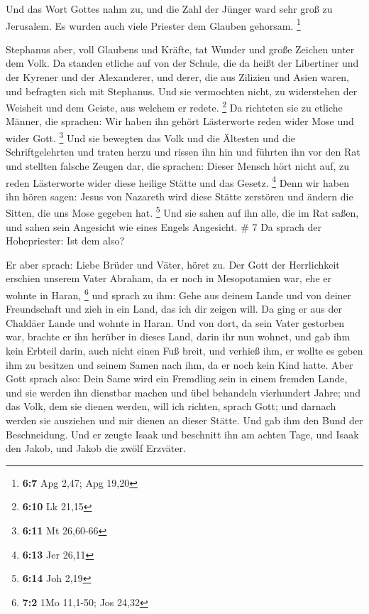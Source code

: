  Und das Wort Gottes nahm zu, und die Zahl der Jünger ward
sehr groß zu Jerusalem. Es wurden auch viele Priester dem Glauben
gehorsam. \footnote{\textbf{6:7} Apg 2,47; Apg 19,20}

 Stephanus aber, voll Glaubens und Kräfte, tat Wunder und
große Zeichen unter dem Volk.  Da standen etliche auf von
der Schule, die da heißt der Libertiner und der Kyrener und der
Alexanderer, und derer, die aus Zilizien und Asien waren, und befragten
sich mit Stephanus.  Und sie vermochten nicht, zu
widerstehen der Weisheit und dem Geiste, aus welchem er redete.
\footnote{\textbf{6:10} Lk 21,15}  Da richteten sie zu
etliche Männer, die sprachen: Wir haben ihn gehört Lästerworte reden
wider Mose und wider Gott. \footnote{\textbf{6:11} Mt 26,60-66}
 Und sie bewegten das Volk und die Ältesten und die
Schriftgelehrten und traten herzu und rissen ihn hin und führten ihn vor
den Rat  und stellten falsche Zeugen dar, die sprachen:
Dieser Mensch hört nicht auf, zu reden Lästerworte wider diese heilige
Stätte und das Gesetz. \footnote{\textbf{6:13} Jer 26,11} 
Denn wir haben ihn hören sagen: Jesus von Nazareth wird diese Stätte
zerstören und ändern die Sitten, die uns Mose gegeben hat. \footnote{\textbf{6:14}
  Joh 2,19}  Und sie sahen auf ihn alle, die im Rat saßen,
und sahen sein Angesicht wie eines Engels Angesicht. \# 7 
Da sprach der Hohepriester: Ist dem also?

 Er aber sprach: Liebe Brüder und Väter, höret zu. Der Gott
der Herrlichkeit erschien unserem Vater Abraham, da er noch in
Mesopotamien war, ehe er wohnte in Haran, \footnote{\textbf{7:2} 1Mo
  11,1-50; Jos 24,32}  und sprach zu ihm: Gehe aus deinem
Lande und von deiner Freundschaft und zieh in ein Land, das ich dir
zeigen will.  Da ging er aus der Chaldäer Lande und wohnte
in Haran. Und von dort, da sein Vater gestorben war, brachte er ihn
herüber in dieses Land, darin ihr nun wohnet,  und gab ihm
kein Erbteil darin, auch nicht einen Fuß breit, und verhieß ihm, er
wollte es geben ihm zu besitzen und seinem Samen nach ihm, da er noch
kein Kind hatte.  Aber Gott sprach also: Dein Same wird ein
Fremdling sein in einem fremden Lande, und sie werden ihn dienstbar
machen und übel behandeln vierhundert Jahre;  und das Volk,
dem sie dienen werden, will ich richten, sprach Gott; und darnach werden
sie ausziehen und mir dienen an dieser Stätte.  Und gab ihm
den Bund der Beschneidung. Und er zeugte Isaak und beschnitt ihn am
achten Tage, und Isaak den Jakob, und Jakob die zwölf Erzväter.

